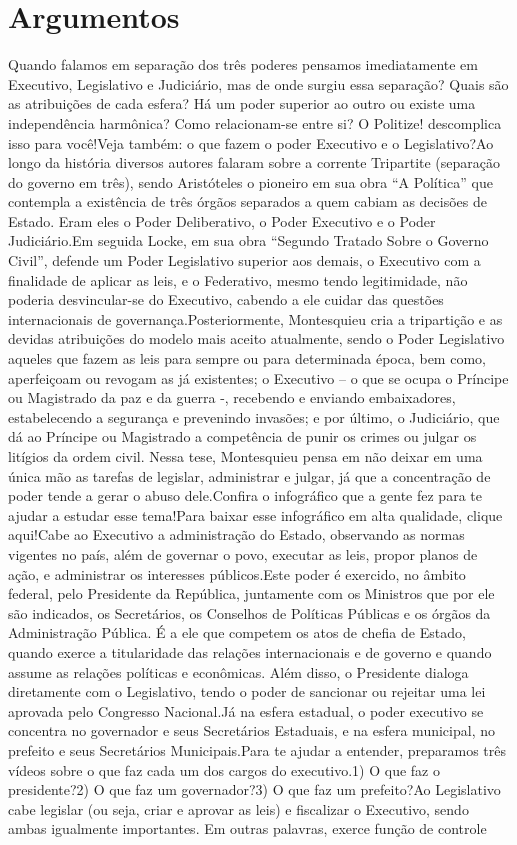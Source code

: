 \documentclass[
   article,       
   12pt,          
   oneside,       
   a4paper,       
   english,       
   brazil,        
   sumario=tradicional
   ]{abntex2}
\begin{document}
\section{Argumentos}
Quando falamos em separação dos três poderes pensamos imediatamente em Executivo, Legislativo e Judiciário, mas de onde surgiu essa separação? Quais são as atribuições de cada esfera? Há um poder superior ao outro ou existe uma independência harmônica? Como relacionam-se entre si? O Politize! descomplica isso para você!Veja também: o que fazem o poder Executivo e o Legislativo?Ao longo da história diversos autores falaram sobre a corrente Tripartite (separação do governo em três), sendo Aristóteles o pioneiro em sua obra “A Política” que contempla a existência de três órgãos separados a quem cabiam as decisões de Estado. Eram eles o Poder Deliberativo, o Poder Executivo e o Poder Judiciário.Em seguida Locke, em sua obra “Segundo Tratado Sobre o Governo Civil”, defende um Poder Legislativo superior aos demais, o Executivo com a finalidade de aplicar as leis, e o Federativo, mesmo tendo legitimidade, não poderia desvincular-se do Executivo, cabendo a ele cuidar das questões internacionais de governança.Posteriormente, Montesquieu cria a tripartição e as devidas atribuições do modelo mais aceito atualmente, sendo o Poder Legislativo aqueles que fazem as leis para sempre ou para determinada época, bem como, aperfeiçoam ou revogam as já existentes; o Executivo – o que se ocupa o Príncipe ou Magistrado da paz e da guerra -, recebendo e enviando embaixadores, estabelecendo a segurança e prevenindo invasões; e por último, o Judiciário, que dá ao Príncipe ou Magistrado a competência de punir os crimes ou julgar os litígios da ordem civil. Nessa tese, Montesquieu pensa em não deixar em uma única mão as tarefas de legislar, administrar e julgar, já que a concentração de poder tende a gerar o abuso dele.Confira o infográfico que a gente fez para te ajudar a estudar esse tema!Para baixar esse infográfico em alta qualidade, clique aqui!Cabe ao Executivo a administração do Estado, observando as normas vigentes no país, além de governar o povo, executar as leis, propor planos de ação, e administrar os interesses públicos.Este poder é exercido, no âmbito federal, pelo Presidente da República, juntamente com os Ministros que por ele são indicados, os Secretários, os Conselhos de Políticas Públicas e os órgãos da Administração Pública. É a ele que competem os atos de chefia de Estado, quando exerce a titularidade das relações internacionais e de governo e quando assume as relações políticas e econômicas. Além disso, o Presidente dialoga diretamente com o Legislativo, tendo o poder de sancionar ou rejeitar uma lei aprovada pelo Congresso Nacional.Já na esfera estadual, o poder executivo se concentra no governador e seus Secretários Estaduais, e na esfera municipal, no prefeito e seus Secretários Municipais.Para te ajudar a entender, preparamos três vídeos sobre o que faz cada um dos cargos do executivo.1) O que faz o presidente?2) O que faz um governador?3) O que faz um prefeito?Ao Legislativo cabe legislar (ou seja, criar e aprovar as leis) e fiscalizar o Executivo, sendo ambas igualmente importantes. Em outras palavras, exerce função de controle 
\end{document}
